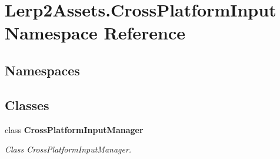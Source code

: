 \hypertarget{namespace_lerp2_assets_1_1_cross_platform_input}{}\section{Lerp2\+Assets.\+Cross\+Platform\+Input Namespace Reference}
\label{namespace_lerp2_assets_1_1_cross_platform_input}
\subsection*{Namespaces}
\begin{DoxyCompactItemize}
\end{DoxyCompactItemize}
\subsection*{Classes}
\begin{DoxyCompactItemize}
\item 
class {\bfseries Cross\+Platform\+Input\+Manager}
\begin{DoxyCompactList}\small\item\em Class Cross\+Platform\+Input\+Manager. \end{DoxyCompactList}\end{DoxyCompactItemize}
